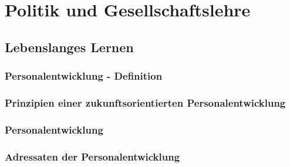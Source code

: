 \section{Politik und Gesellschaftslehre}

\subsection{Lebenslanges Lernen}

\subsubsection{Personalentwicklung - Definition}
\subsubsection{Prinzipien einer zukunftsorientierten Personalentwicklung}
\subsubsection{Personalentwicklung}
\subsubsection{Adressaten der Personalentwicklung}
